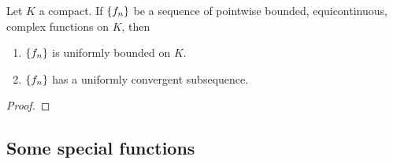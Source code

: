 \begin{theorem}
	Let $K$ a compact.
	If $\left\{f_n\right\}$ be a sequence of pointwise bounded, equicontinuous, complex functions on $K$, then
	\begin{enumerate}
		\item $\left\{f_n\right\}$ is uniformly bounded on $K$.
		\item $\left\{f_n\right\}$ has a uniformly convergent subsequence.
	\end{enumerate}
\end{theorem}
\begin{proof}
\end{proof}

\subsection{Some special functions}



